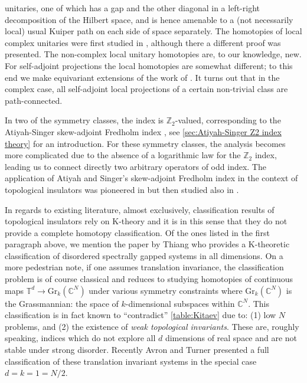\documentclass[a4paper,10pt]{article}
\numberwithin{equation}{section}
\theoremstyle{plain}
\theoremstyle{plain}
\theoremstyle{plain}
\theoremstyle{plain}
\theoremstyle{plain}
\theoremstyle{remark}
\theoremstyle{definition}
\theoremstyle{plain}
\newcommand{\ZZ}{\mathbb{Z}}
\newcommand{\CC}{\mathbb{C}}
\begin{document}
unitaries, one of which has a gap and the other diagonal in a left-right decomposition of the Hilbert space, and is hence amenable to a (not necessarily local) usual Kuiper path on each side of space separately. The homotopies of local complex unitaries were first studied in \cite{CareyHurstOBrien1982}, although there a different proof was presented. The non-complex local unitary homotopies are, to our knowledge, new. For self-adjoint projections the local homotopies are somewhat different; to this end we make equivariant extensions of the work of \cite{AndruchowChiumientoLucero2015}. It turns out that in the complex case, all self-adjoint local projections of a certain non-trivial class are path-connected.
	
	In two of the symmetry classes, the index is $\ZZ_2$-valued, corresponding to the Atiyah-Singer skew-adjoint Fredholm index \cite{AtiyahSinger1969}, see \cref{sec:Atiyah-Singer Z2 index theory} for an introduction. For these symmetry classes, the analysis becomes more complicated due to the absence of a logarithmic law for the $\ZZ_2$ index, leading us to connect directly two arbitrary operators of odd index. The application of Atiyah and Singer's skew-adjoint Fredholm index in the context of topological insulators was pioneered in \cite{Schulz-Baldes2015} but then studied also in \cite{KatsuraKoma2016,FSSWY22,BSS23}.
	
	In regards to existing literature, almost exclusively, classification results of topological insulators rely on K-theory and it is in this sense that they do not provide a complete homotopy classification. Of the ones listed in the first paragraph above, we mention the paper by Thiang \cite{Thiang2016} who provides a K-theoretic classification of disordered spectrally gapped systems in all dimensions. On a more pedestrian note, if one assumes translation invariance, the classification problem is of course classical and reduces to studying homotopies of continuous maps $\mathbb{T}^d\to\mathrm{Gr}_k(\CC^N)$ under various symmetry constraints where $\mathrm{Gr}_k(\CC^N)$ is the Grassmannian: the space of $k$-dimensional subspaces within $\CC^N$. This classification is in fact known to ``contradict'' \cref{table:Kitaev} due to: (1) low $N$ problems, and (2) the existence of \emph{weak topological invariants}. These are, roughly speaking, indices which do not explore all $d$ dimensions of real space and are not stable under strong disorder. Recently Avron and Turner \cite{AvronTurner2022} presented a full classification of these translation invariant systems in the special case $d=k=1=N/2$.
	
\end{document}
